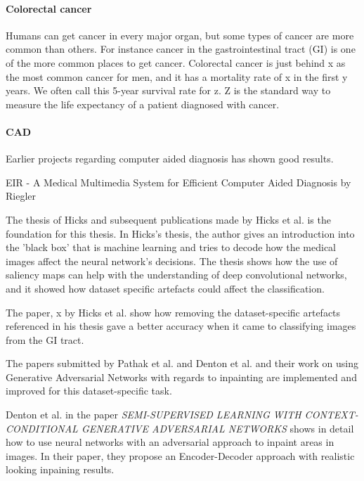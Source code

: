 \paragraph{Colorectal cancer}
Humans can get cancer in every major organ, but some types of cancer are more common than others.    
For instance cancer in the gastrointestinal tract (GI) is one of the more common places to get cancer. Colorectal cancer is just behind x as the most common cancer for men, and it has a mortality rate of x in the first y years. %
We often call this 5-year survival rate for z. Z is the standard way to measure the life expectancy of a patient diagnosed with cancer. 

\paragraph{CAD}
Earlier projects regarding computer aided diagnosis has shown good results.



EIR - A Medical Multimedia System for Efficient
Computer Aided Diagnosis by Riegler 

The thesis of Hicks and subsequent publications made by Hicks et al. is the foundation for this thesis. In Hicks's thesis, the author gives an introduction into the 'black box' that is machine learning and tries to decode how the medical images affect the neural network's decisions. 
The thesis shows how the use of saliency maps can help with the understanding of deep convolutional networks, and it showed how dataset specific artefacts could affect the classification.


\iffalse
The paper, x by Hicks et al. show how removing the dataset-specific artefacts referenced in his thesis gave a better accuracy when it came to classifying images from the GI tract.


The papers submitted by Pathak et al. and Denton et al. and their work on using Generative Adversarial Networks with regards to inpainting are implemented and improved for this dataset-specific task.

Denton et al. in the paper \textit{SEMI-SUPERVISED LEARNING WITH
CONTEXT-CONDITIONAL GENERATIVE
ADVERSARIAL NETWORKS} shows in detail how to use neural networks with an adversarial approach to inpaint areas in images. In their paper, they propose an Encoder-Decoder approach with realistic looking inpaining results.


